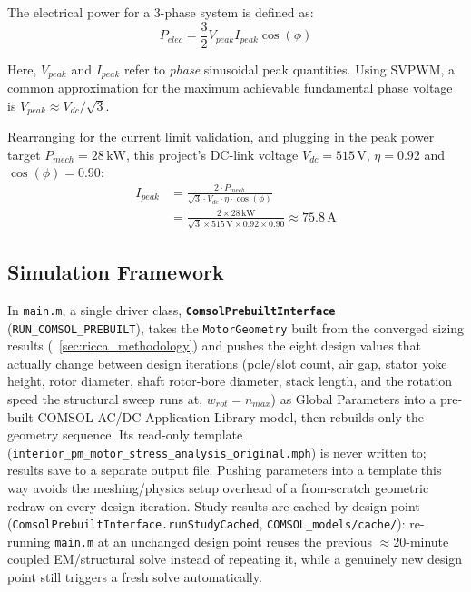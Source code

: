 \documentclass[10pt,final,journal,a4paper,oneside,twocolumn]{IEEEtran}
\begin{document}
The electrical power for a 3-phase system is defined as:
\begin{equation}
    P_{elec} = \frac{3}{2} V_{peak} I_{peak} \cos(\phi)
\end{equation}

Here, $V_{peak}$ and $I_{peak}$ refer to \emph{phase} sinusoidal peak quantities. Using SVPWM, a common approximation for the maximum achievable fundamental phase voltage is $V_{peak}\approx V_{dc}/\sqrt{3}$.

Rearranging for the current limit validation, and plugging in the peak power target $P_{mech}=28\,\text{kW}$, this project's DC-link voltage $V_{dc}=515\,\text{V}$, $\eta=0.92$ and $\cos(\phi)=0.90$:
\begin{equation}
\begin{split}
    I_{peak} &= \frac{2 \cdot P_{mech}}{\sqrt{3} \cdot V_{dc} \cdot \eta \cdot \cos(\phi)} \\
    &= \frac{2\times28\,\text{kW}}{\sqrt{3}\times515\,\text{V}\times0.92\times0.90} \approx 75.8\,\text{A}
\end{split}
\end{equation}

\subsection{Simulation Framework}
\label{sec:sim_framework}
In \texttt{main.m}, a single driver class, \textbf{\texttt{ComsolPrebuiltInterface}} (\texttt{RUN\_COMSOL\_PREBUILT}), takes the \texttt{MotorGeometry} built from the converged sizing results (\sectionname~\ref{sec:ricca_methodology}) and pushes the eight design values that actually change between design iterations (pole/slot count, air gap, stator yoke height, rotor diameter, shaft rotor-bore diameter, stack length, and the rotation speed the structural sweep runs at, $w_{rot}=n_{max}$) as Global Parameters into a pre-built COMSOL AC/DC Application-Library model, then rebuilds only the geometry sequence. Its read-only template (\texttt{interior\_\allowbreak pm\_\allowbreak motor\_\allowbreak stress\_\allowbreak analysis\_\allowbreak original.mph}) is never written to; results save to a separate output file. Pushing parameters into a template this way avoids the meshing/physics setup overhead of a from-scratch geometric redraw on every design iteration. Study results are cached by design point (\texttt{ComsolPrebuiltInterface.runStudyCached}, \texttt{COMSOL\_models/cache/}): re-running \texttt{main.m} at an unchanged design point reuses the previous $\approx$20-minute coupled EM/structural solve instead of repeating it, while a genuinely new design point still triggers a fresh solve automatically.
\end{document}
